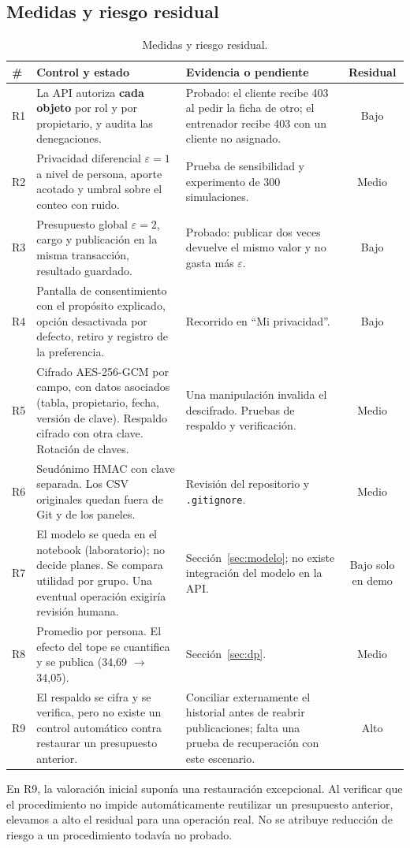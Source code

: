 \documentclass[11pt]{article}
\begin{document}
\subsection{Medidas y riesgo residual}
\begin{table}[H]
\centering\small
\begin{tabularx}{\textwidth}{@{}lYp{4.4cm}c@{}}
\toprule
\textbf{\#} & \textbf{Control y estado} & \textbf{Evidencia o pendiente} & \textbf{Residual} \\
\midrule
R1 & La API autoriza \textbf{cada objeto} por rol y por propietario, y audita las denegaciones. & Probado: el cliente recibe 403 al pedir la ficha de otro; el entrenador recibe 403 con un cliente no asignado. & Bajo \\
R2 & Privacidad diferencial $\varepsilon = 1$ a nivel de persona, aporte acotado y umbral sobre el conteo con ruido. & Prueba de sensibilidad y experimento de 300 simulaciones. & Medio \\
R3 & Presupuesto global $\varepsilon = 2$, cargo y publicación en la misma transacción, resultado guardado. & Probado: publicar dos veces devuelve el mismo valor y no gasta más $\varepsilon$. & Bajo \\
R4 & Pantalla de consentimiento con el propósito explicado, opción desactivada por defecto, retiro y registro de la preferencia. & Recorrido en ``Mi privacidad''. & Bajo \\
R5 & Cifrado AES-256-GCM por campo, con datos asociados (tabla, propietario, fecha, versión de clave). Respaldo cifrado con otra clave. Rotación de claves. & Una manipulación invalida el descifrado. Pruebas de respaldo y verificación. & Medio \\
R6 & Seudónimo HMAC con clave separada. Los CSV originales quedan fuera de Git y de los paneles. & Revisión del repositorio y \texttt{.gitignore}. & Medio \\
R7 & El modelo se queda en el notebook (laboratorio); no decide planes. Se compara utilidad por grupo. Una eventual operación exigiría revisión humana. & Sección~\ref{sec:modelo}; no existe integración del modelo en la API. & Bajo solo en demo \\
R8 & Promedio por persona. El efecto del tope se cuantifica y se publica (34,69 $\rightarrow$ 34,05). & Sección~\ref{sec:dp}. & Medio \\
R9 & El respaldo se cifra y se verifica, pero no existe un control automático contra restaurar un presupuesto anterior. & Conciliar externamente el historial antes de reabrir publicaciones; falta una prueba de recuperación con este escenario. & Alto \\
\bottomrule
\end{tabularx}
\caption{Medidas y riesgo residual.}
\end{table}
En R9, la valoración inicial suponía una restauración excepcional. Al verificar que el procedimiento no impide automáticamente reutilizar un presupuesto anterior, elevamos a alto el residual para una operación real. No se atribuye reducción de riesgo a un procedimiento todavía no probado.
\end{document}
